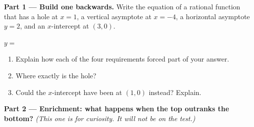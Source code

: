 \documentclass[10pt]{article}
\begin{document}
\begin{tcolorbox}[colback=white, colframe=black!40, title=\textbf{Tier E --- Extension},
    fonttitle=\bfseries, arc=1.5mm, left=3mm, right=3mm, top=2mm, bottom=2mm, breakable]
\textbf{Part 1 --- Build one backwards.} Write the equation of a rational function that has a hole at
$x=1$, a vertical asymptote at $x=-4$, a horizontal asymptote $y=2$, and an $x$-intercept at $(3,0)$.
\begin{center}
$y=$ \blank{6.0cm}
\end{center}
\begin{enumerate}[label=(\alph*), leftmargin=2.1em, itemsep=5pt]
  \item Explain how each of the four requirements forced part of your answer.
  \item Where exactly is the hole? \blank{2.0cm}
  \item Could the $x$-intercept have been at $(1,0)$ instead? Explain. \writeline
\end{enumerate}

\vspace{5pt}
\textbf{Part 2 --- Enrichment: what happens when the top outranks the bottom?}
\emph{(This one is for curiosity. It will not be on the test.)}


\end{tcolorbox}
\end{document}
